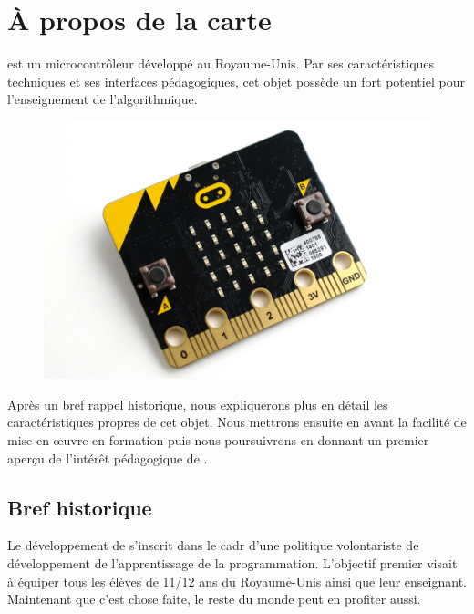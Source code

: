 
\section{À propos de la carte \mb}


\mb est un microcontrôleur développé au Royaume-Unis.
Par ses caractéristiques techniques et ses interfaces
pédagogiques, cet objet possède un fort potentiel pour
l’enseignement de l’algorithmique.



\begin{figure}
	\includegraphics[width=\linewidth]{res/mb-ap-01.png}
\end{figure}

Après un bref rappel historique, nous expliquerons plus en détail les caractéristiques propres de cet objet. Nous mettrons ensuite en avant la facilité de mise en œuvre en formation puis nous poursuivrons en donnant un premier aperçu de l’intérêt pédagogique de \mb.

\subsection{Bref historique}


Le développement de \mb s’inscrit dans le cadr d’une politique volontariste de développement de l’apprentissage de la programmation. L’objectif premier visait à équiper tous les élèves de 11/12 ans du Royaume-Unis ainsi que leur enseignant. Maintenant que c’est chose faite, le reste du monde peut en profiter aussi.



